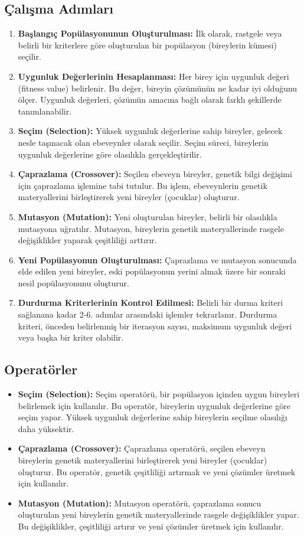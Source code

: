 \subsection{Çalışma Adımları}
\begin{enumerate}
    \item \textbf{Başlangıç Popülasyonunun Oluşturulması:} İlk olarak, rastgele veya belirli bir kriterlere göre oluşturulan bir popülasyon (bireylerin kümesi) seçilir.
    \item \textbf{Uygunluk Değerlerinin Hesaplanması:} Her birey için uygunluk değeri (fitness value) belirlenir. Bu değer, bireyin çözümünün ne kadar iyi olduğunu ölçer. Uygunluk değerleri, çözümün amacına bağlı olarak farklı şekillerde tanımlanabilir.
    \item \textbf{Seçim (Selection):} Yüksek uygunluk değerlerine sahip bireyler, gelecek nesle taşınacak olan ebeveynler olarak seçilir. Seçim süreci, bireylerin uygunluk değerlerine göre olasılıkla gerçekleştirilir.
    \item \textbf{Çaprazlama (Crossover):} Seçilen ebeveyn bireyler, genetik bilgi değişimi için çaprazlama işlemine tabi tutulur. Bu işlem, ebeveynlerin genetik materyallerini birleştirerek yeni bireyler (çocuklar) oluşturur.
    \item \textbf{Mutasyon (Mutation):} Yeni oluşturulan bireyler, belirli bir olasılıkla mutasyona uğratılır. Mutasyon, bireylerin genetik materyallerinde rasgele değişiklikler yaparak çeşitliliği arttırır.
    \item \textbf{Yeni Popülasyonun Oluşturulması:} Çaprazlama ve mutasyon sonucunda elde edilen yeni bireyler, eski popülasyonun yerini almak üzere bir sonraki nesil popülasyonunu oluşturur.
    \item \textbf{Durdurma Kriterlerinin Kontrol Edilmesi:} Belirli bir durma kriteri sağlanana kadar 2-6. adımlar arasındaki işlemler tekrarlanır. Durdurma kriteri, önceden belirlenmiş bir iterasyon sayısı, maksimum uygunluk değeri veya başka bir kriter olabilir.
\end{enumerate}

\subsection{Operatörler}
\begin{itemize}
    \item \textbf{Seçim (Selection):} Seçim operatörü, bir popülasyon içinden uygun bireyleri belirlemek için kullanılır. Bu operatör, bireylerin uygunluk değerlerine göre seçim yapar. Yüksek uygunluk değerlerine sahip bireylerin seçilme olasılığı daha yüksektir.
    \item \textbf{Çaprazlama (Crossover):} Çaprazlama operatörü, seçilen ebeveyn bireylerin genetik materyallerini birleştirerek yeni bireyler (çocuklar) oluşturur. Bu operatör, genetik çeşitliliği artırmak ve yeni çözümler üretmek için kullanılır.
    \item \textbf{Mutasyon (Mutation):} Mutasyon operatörü, çaprazlama sonucu oluşturulan yeni bireylerin genetik materyallerinde rasgele değişiklikler yapar. Bu değişiklikler, çeşitliliği artırır ve yeni çözümler üretmek için kullanılır.
\end{itemize}

\newpage